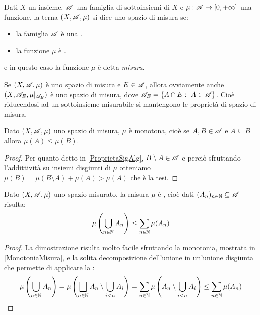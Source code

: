 \begin{definition}
	Dati $X$ un insieme, $\mathscr A$ una famiglia di sottoinsiemi di $X$ e $\mu:\mathscr A\to [0,+\infty]$ una funzione, la terna $(X,\mathscr A, \mu)$ si dice uno spazio di misura se:
	\begin{itemize}
		\item la famiglia $\mathscr A$ è una \sigalg{}.
		\item la funzione $\mu$ è \sigadd{}.
	\end{itemize}
	e in questo caso la funzione $\mu$ è detta \emph{misura}.
\end{definition}

\begin{remark}
	Se $(X,\mathscr A,\mu)$ è uno spazio di misura e $E\in\mathscr A$, allora ovviamente anche $(X,\mathscr A_E,\mu|_{\mathscr A_E})$ è uno spazio di misura, dove $\A_E=\{A\cap E:\ A\in\A\}$. Cioè riducendosi ad un sottoinsieme misurabile si mantengono le proprietà di spazio di misura.
\end{remark}

\begin{remark}\label{MonotoniaMisura}
	Dato $(X,\mathscr A,\mu)$ uno spazio di misura, $\mu$ è monotona, cioè se $A,B\in\mathscr A$ e $A\subseteq B$ allora $\mu(A)\le \mu(B)$.
\end{remark}
\begin{proof}
	Per quanto detto in \cref{ProprietaSigAlg}, $B\setminus A\in\mathscr A$ e perciò sfruttando l'addittività su insiemi disgiunti di $\mu$ otteniamo $\mu(B)=\mu(B\setminus A)+\mu(A)>\mu(A)$ che è la tesi.
\end{proof}
\begin{remark}\label{SubAdditivitaMisura}
	Dato $(X,\mathscr A,\mu)$ uno spazio misurato, la misura $\mu$ è \sigsubadd{}, cioè dati $(A_n)_{n\in\mathbb N}\subseteq\mathscr A$ risulta:
	\begin{equation*}
		\mu\left(\bigcup_{n\in\mathbb N} A_n \right)\le \sum_{n\in\mathbb N}\mu(A_n)
	\end{equation*}
\end{remark}
\begin{proof}
	La dimostrazione risulta molto facile sfruttando la monotonia, mostrata in \cref{MonotoniaMisura}, e la solita decomposizione dell'unione in un'unione disgiunta che permette di applicare la \sigadd[ità]:
	\begin{equation*}
		\mu\left(\bigcup_{n\in\mathbb N} A_n \right)=\mu\left(\bigsqcup_{n\in\mathbb N} A_n\setminus\bigcup_{i<n}A_i \right)=
		\sum_{n\in\mathbb N}\mu\left(A_n\setminus\bigcup_{i<n}A_i\right)\le \sum_{n\in\mathbb N}\mu(A_n)
	\end{equation*}
\end{proof}



